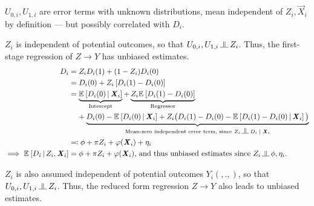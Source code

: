 $U_{0,i}, U_{1,i}$ are error terms with unknown distributions, mean independent of $Z_i, \vec X_i$ by definition --- but possibly correlated with $D_i$.

$Z_i$ is independent of potential outcomes, so that $U_{0,i}, U_{1,i} \indep Z_i$.
Thus, the first-stage regression of $Z \to Y$ has unbiased estimates.
\begin{align*}
    D_i &= Z_i D_i(1) + (1 - Z_i) D_i(0) \\
        &= D_i(0) +
            Z_i \left[ D_i(1) - D_i(0) \right] \\
        &= \underbrace{\Egiven{D_i(0)}{\vec X_i}        
        }_{\text{Intercept}} +
            \underbrace{Z_i \E{ D_i(1) - D_i(0)}}_{
                \text{Regressor}} \\
            & \;\;\;\; + \underbrace{
                D_i(0) - \Egiven{D_i(0)}{\vec X_i}
                + Z_i \big( D_i(1) - D_i(0) - \Egiven{ D_i(1) - D_i(0)}{\vec X_i}\big)}_{
                \text{Mean-zero independent error term, since }Z_i \indep D_i \; | \; \vec X_i} \\
        &\eqqcolon \phi + \pi Z_i + \varphi(\vec X_i) + \eta_i \\
    \implies \Egiven{D_i}{Z_i, \vec X_i}&=
        \phi + \pi Z_i + \varphi(\vec X_i)
        \text{, and thus unbiased estimates since } Z_i \indep \phi, \eta_i.
\end{align*}

$Z_i$ is also assumed independent of potential outcomes $Y_i(,.,)$, so that $U_{0,i}, U_{1,i} \indep Z_i$.
Thus, the reduced form regression $Z \to Y$ also leads to unbiased estimates.


